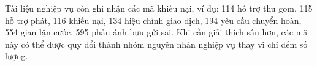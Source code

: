 Tài liệu nghiệp vụ còn ghi nhận các mã khiếu nại, ví dụ: 114 hỗ trợ thu gom, 115 hỗ trợ phát, 116 khiếu nại, 134 hiệu chỉnh giao dịch, 194 yêu cầu chuyển hoàn, 554 gian lận cước, 595 phản ánh bưu gửi sai. Khi cần giải thích sâu hơn, các mã này có thể được quy đổi thành nhóm nguyên nhân nghiệp vụ thay vì chỉ đếm số lượng.
